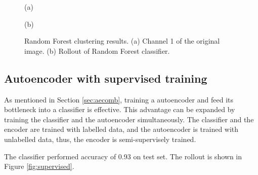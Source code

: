 \documentclass{article}
\begin{document}
        \begin{figure}[ht]
            \centering
            \begin{minipage}{0.49\hsize}
                \centering
                \caption*{(a)}
            \end{minipage}
            \begin{minipage}{0.49\hsize}
                \centering
                \caption*{(b)}
            \end{minipage}
            \caption{
                Random Forest clustering results.
                (a) Channel 1 of the original image.
                (b) Rollout of Random Forest classifier.
            }
            \label{fig:random_forest}
        \end{figure}

    \subsection{Autoencoder with supervised training}
        As mentioned in Section \ref{sec:aecomb},
        training a autoencoder and feed its bottleneck into a classifier is effective.
        This advantage can be expanded by training the classifier and the autoencoder simultaneously.
        The classifier and the encoder are trained with labelled data,
        and the autoencoder is trained with unlabelled data,
        thus, the encoder is semi-supervisely trained.
        
        The classifier performed accuracy of 0.93 on test set.
        The rollout is shown in Figure \ref{fig:supervised}.
\end{document}
